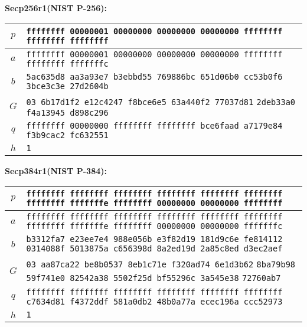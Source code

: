 \textbf{Secp256r1(NIST P-256):}
\begin{center}    
\begin{tabular}{|c|p{9.8cm}|} \hline
    $p$ &   \texttt{ffffffff 00000001 00000000 00000000 00000000 ffffffff} \newline
            \texttt{ffffffff ffffffff} \\ \hline
    $a$ &   \texttt{ffffffff 00000001 00000000 00000000 00000000 ffffffff} \newline
            \texttt{ffffffff fffffffc} \\ \hline
    $b$ &   \texttt{5ac635d8 aa3a93e7 b3ebbd55 769886bc 651d06b0 cc53b0f6} \newline
            \texttt{3bce3c3e 27d2604b} \\ \hline
    $G$ &   \texttt{\phantom{000000}03 6b17d1f2 e12c4247 f8bce6e5 63a440f2 77037d81} \newline
            \texttt{2deb33a0 f4a13945 d898c296} \\ \hline
    $q$ &   \texttt{ffffffff 00000000 ffffffff ffffffff bce6faad a7179e84} \newline
            \texttt{f3b9cac2 fc632551} \\ \hline
    $h$ &   \texttt{1} \\ \hline
\end{tabular}
\end{center}
    
\clearpage
\textbf{Secp384r1(NIST P-384):}
\begin{center}
\begin{tabular}{|c|p{9.8cm}|} \hline
    $p$ &   \texttt{ffffffff ffffffff ffffffff ffffffff ffffffff ffffffff} \newline
            \texttt{ffffffff fffffffe ffffffff 00000000 00000000 ffffffff} \\ \hline
    $a$ &   \texttt{ffffffff ffffffff ffffffff ffffffff ffffffff ffffffff} \newline
            \texttt{ffffffff fffffffe ffffffff 00000000 00000000 fffffffc} \\ \hline
    $b$ &   \texttt{b3312fa7 e23ee7e4 988e056b e3f82d19 181d9c6e fe814112} \newline
            \texttt{0314088f 5013875a c656398d 8a2ed19d 2a85c8ed d3ec2aef} \\ \hline
    $G$ &   \texttt{\phantom{000000}03 aa87ca22 be8b0537 8eb1c71e f320ad74 6e1d3b62} \newline
            \texttt{8ba79b98 59f741e0 82542a38 5502f25d bf55296c 3a545e38} \newline
            \texttt{72760ab7} \\ \hline
    $q$ &   \texttt{ffffffff ffffffff ffffffff ffffffff ffffffff ffffffff} \newline
            \texttt{c7634d81 f4372ddf 581a0db2 48b0a77a ecec196a ccc52973} \\ \hline
    $h$ &   \texttt{1} \\ \hline
\end{tabular}
\end{center}

